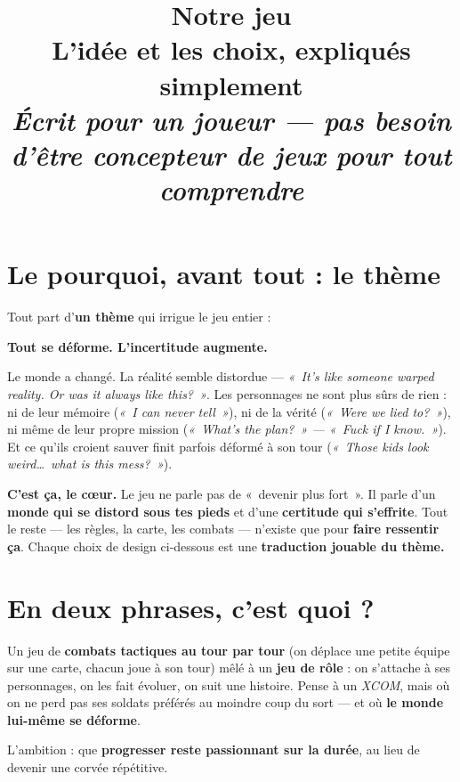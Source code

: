 \documentclass[11pt,a4paper]{article}
\title{\vspace{-1.6em}\textbf{\color{ink}\Huge Notre jeu}\\[0.3em]
\large\color{accent}L'idée et les choix, expliqués simplement\\[0.25em]
\normalsize\color{ink}\itshape Écrit pour un joueur --- pas besoin d'être concepteur de jeux pour tout comprendre}
\author{}
\date{}
\begin{document}
\maketitle
\vspace{-3em}

\section{Le pourquoi, avant tout : le thème}
Tout part d'\textbf{un thème} qui irrigue le jeu entier :

\begin{themebox}
\centering\large\textbf{\color{theme}Tout se déforme. L'incertitude augmente.}
\end{themebox}

\noindent Le monde a changé. La réalité semble distordue --- \textit{«~It's like someone warped reality. Or was it always like this?~»}. Les personnages ne sont plus sûrs de rien : ni de leur mémoire (\textit{«~I can never tell~»}), ni de la vérité (\textit{«~Were we lied to?~»}), ni même de leur propre mission (\textit{«~What's the plan?~» --- «~Fuck if I know.~»}). Et ce qu'ils croient sauver finit parfois déformé à son tour (\textit{«~Those kids look weird\dots\ what is this mess?~»}).

\smallskip
\textbf{C'est ça, le cœur.} Le jeu ne parle pas de «~devenir plus fort~». Il parle d'un \textbf{monde qui se distord sous tes pieds} et d'une \textbf{certitude qui s'effrite}. Tout le reste --- les règles, la carte, les combats --- n'existe que pour \textbf{faire ressentir ça}. Chaque choix de design ci-dessous est une \textbf{traduction jouable du thème.}

\section{En deux phrases, c'est quoi ?}
Un jeu de \textbf{combats tactiques au tour par tour} (on déplace une petite équipe sur une carte, chacun joue à son tour) mêlé à un \textbf{jeu de rôle} : on s'attache à ses personnages, on les fait évoluer, on suit une histoire. Pense à un \textit{XCOM}, mais où on ne perd pas ses soldats préférés au moindre coup du sort --- et où \textbf{le monde lui-même se déforme}.

\smallskip
L'ambition : que \textbf{progresser reste passionnant sur la durée}, au lieu de devenir une corvée répétitive.
\end{document}
